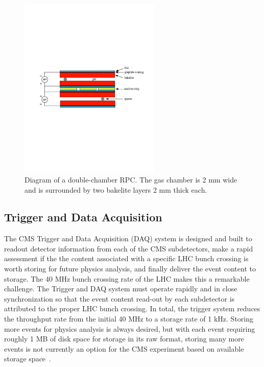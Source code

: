 \begin{figure}[htbp]
\centering
     \includegraphics[width=0.6\textwidth]{cms_and_lhc/plots/cms_muon_rpc.pdf}
     \caption{
Diagram of a double-chamber RPC. The gas chamber is 2 mm wide and is surrounded by two
bakelite layers 2 mm thick each.
     }
     \label{fig:cms_muon_rpc}
\end{figure}



\subsection{Trigger and Data Acquisition}
The CMS Trigger and Data Acquisition (DAQ) system is designed and built to readout detector
information from each of the CMS subdetectors, make a rapid assessment if the the content
associated with a specific LHC bunch crossing is worth storing for future physics analysis,
and finally deliver the event content to storage. The 40 MHz bunch crossing rate of
the LHC makes this a remarkable challenge. The Trigger and DAQ system must operate rapidly
and in close synchronization so that the event content read-out by each subdetector is attributed
to the proper LHC bunch crossing. In total, the trigger system reduces the throughput rate from the
initial 40 MHz to a storage rate of 1 kHz. Storing more events for physics analysis is
always desired, but with each event requiring roughly 1 MB of disk space for storage in its
raw format, storing many more events is not currently an option for the CMS experiment based 
on available storage space~\cite{CMS-Proposal}. 



